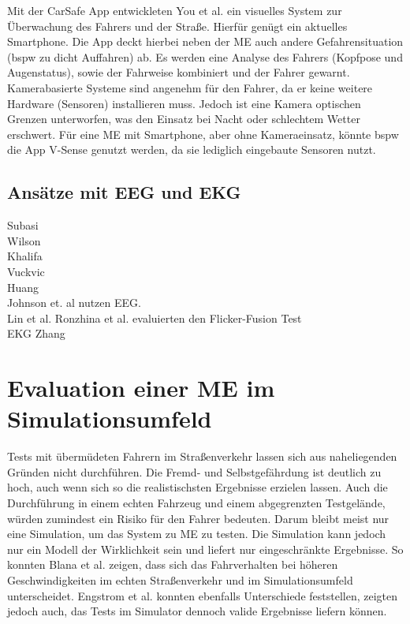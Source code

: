 {Mit der CarSafe App entwickleten You et al. \cite{You:2013:CAA:2462456.2465428} ein visuelles System zur Überwachung des Fahrers und der Straße. Hierfür genügt ein aktuelles Smartphone. Die App deckt hierbei neben der \acl{ME} auch andere Gefahrensituation (\acl{bspw} zu dicht Auffahren) ab. Es werden eine Analyse des Fahrers (Kopfpose und Augenstatus), sowie der Fahrweise kombiniert und der Fahrer gewarnt. Kamerabasierte Systeme sind angenehm für den Fahrer, da er keine weitere Hardware (Sensoren) installieren muss. Jedoch ist eine Kamera optischen Grenzen unterworfen, was den Einsatz bei Nacht oder schlechtem Wetter erschwert. Für eine \acl{ME} mit Smartphone, aber ohne Kameraeinsatz, könnte \acl{bspw} die App V-Sense \cite{Chen:2015:ISV:2742647.2742659} genutzt werden, da sie lediglich  eingebaute Sensoren nutzt.

\subsection{Ansätze mit EEG und EKG}
Subasi \cite{Subasi:2005:ARA:1707423.1707550}\\
Wilson \cite{wilson_890161}\\
Khalifa \cite{khalifa_893852}\\
Vuckvic \cite{Vuckovic2002349}\\
Huang \cite{Huang_548971}\\
Johnson et. al \cite{Johnson11} nutzen EEG.\\
Lin et al. \cite{Lin05eeg-baseddrowsiness}
Ronzhina et al. \cite{Ronzhina:2011:UEV:2093698.2093733} evaluierten den Flicker-Fusion Test \\

EKG
Zhang \cite{zhang_6513058}


\section{Evaluation einer \acl{ME} im Simulationsumfeld}
\label{chap:eval}

Tests mit übermüdeten Fahrern im Straßenverkehr lassen sich aus naheliegenden Gründen nicht durchführen. Die Fremd- und Selbstgefährdung ist deutlich zu hoch, auch wenn sich so die realistischsten Ergebnisse erzielen lassen. Auch die Durchführung in einem echten Fahrzeug und einem abgegrenzten Testgelände, würden zumindest ein Risiko für den Fahrer bedeuten.
Darum bleibt meist nur eine Simulation, um das System zu \acl{ME} zu testen. Die Simulation kann jedoch nur ein Modell der Wirklichkeit sein und liefert nur eingeschränkte Ergebnisse. So konnten Blana et al. \cite{Blana_1} zeigen, dass sich das Fahrverhalten bei höheren Geschwindigkeiten im echten Straßenverkehr und im Simulationsumfeld unterscheidet. Engstrom et al.  \cite{Engstrom_2322937} konnten ebenfalls Unterschiede feststellen, zeigten jedoch auch, das Tests im Simulator dennoch valide Ergebnisse liefern können.

}
